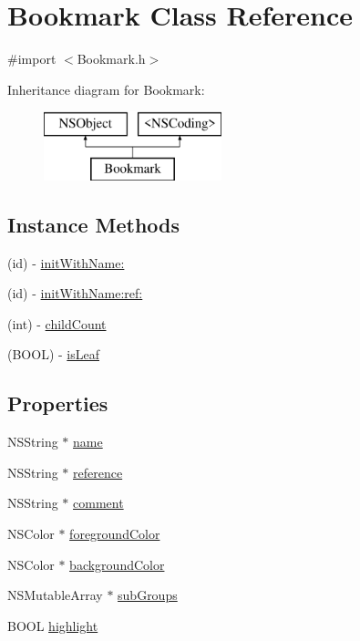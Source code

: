 \hypertarget{interface_bookmark}{\section{Bookmark Class Reference}
\label{interface_bookmark}
}


{\ttfamily \#import $<$Bookmark.\-h$>$}

Inheritance diagram for Bookmark\-:\begin{figure}[H]
\begin{center}
\leavevmode
\includegraphics[height=2.000000cm]{interface_bookmark}
\end{center}
\end{figure}
\subsection*{Instance Methods}
\begin{DoxyCompactItemize}
\item 
(id) -\/ \hyperlink{interface_bookmark_a687b1bb22908922ae1e4a8261ef86af3}{init\-With\-Name\-:}
\item 
(id) -\/ \hyperlink{interface_bookmark_a163c13f15413b5becd9c0082d4a27582}{init\-With\-Name\-:ref\-:}
\item 
(int) -\/ \hyperlink{interface_bookmark_aa61d11d21ba66ad6cadb21b2d081ed21}{child\-Count}
\item 
(B\-O\-O\-L) -\/ \hyperlink{interface_bookmark_ab7396e5c1bef360671d5b5f17dcedd5c}{is\-Leaf}
\end{DoxyCompactItemize}
\subsection*{Properties}
\begin{DoxyCompactItemize}
\item 
N\-S\-String $\ast$ \hyperlink{interface_bookmark_afc8ccc6676addc3b49a494b2bf969c68}{name}
\item 
N\-S\-String $\ast$ \hyperlink{interface_bookmark_a934a327293856e28b3dde0cab70e273c}{reference}
\item 
N\-S\-String $\ast$ \hyperlink{interface_bookmark_a67e83577aa6f1a16db5866b1541516ae}{comment}
\item 
N\-S\-Color $\ast$ \hyperlink{interface_bookmark_a61b855b3ad05f0b98097dcaa50d2b999}{foreground\-Color}
\item 
N\-S\-Color $\ast$ \hyperlink{interface_bookmark_a19973f93c59e17cdd4d2bfdcdcfe2fc9}{background\-Color}
\item 
N\-S\-Mutable\-Array $\ast$ \hyperlink{interface_bookmark_a17819aecf80f28455ff11ac871c8a381}{sub\-Groups}
\item 
B\-O\-O\-L \hyperlink{interface_bookmark_a1967182200c2f96781f5626a9c678f7e}{highlight}
\end{DoxyCompactItemize}


